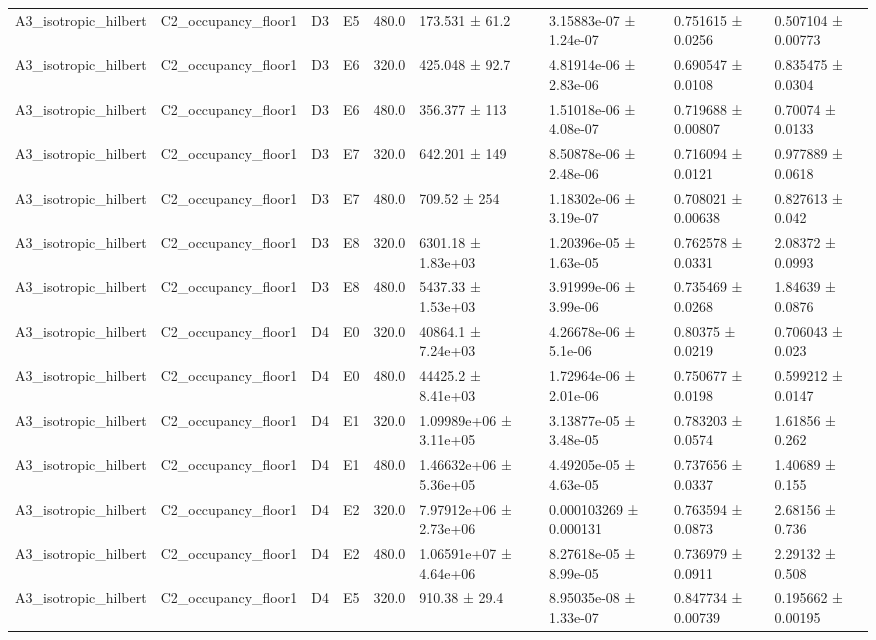 \begin{table}
\begin{tabular}{lllllllll}
A3\_isotropic\_hilbert & C2\_occupancy\_floor1 & D3 & E5 & 480.0 & 173.531 ± 61.2 & 3.15883e-07 ± 1.24e-07 & 0.751615 ± 0.0256 & 0.507104 ± 0.00773 \\
A3\_isotropic\_hilbert & C2\_occupancy\_floor1 & D3 & E6 & 320.0 & 425.048 ± 92.7 & 4.81914e-06 ± 2.83e-06 & 0.690547 ± 0.0108 & 0.835475 ± 0.0304 \\
A3\_isotropic\_hilbert & C2\_occupancy\_floor1 & D3 & E6 & 480.0 & 356.377 ± 113 & 1.51018e-06 ± 4.08e-07 & 0.719688 ± 0.00807 & 0.70074 ± 0.0133 \\
A3\_isotropic\_hilbert & C2\_occupancy\_floor1 & D3 & E7 & 320.0 & 642.201 ± 149 & 8.50878e-06 ± 2.48e-06 & 0.716094 ± 0.0121 & 0.977889 ± 0.0618 \\
A3\_isotropic\_hilbert & C2\_occupancy\_floor1 & D3 & E7 & 480.0 & 709.52 ± 254 & 1.18302e-06 ± 3.19e-07 & 0.708021 ± 0.00638 & 0.827613 ± 0.042 \\
A3\_isotropic\_hilbert & C2\_occupancy\_floor1 & D3 & E8 & 320.0 & 6301.18 ± 1.83e+03 & 1.20396e-05 ± 1.63e-05 & 0.762578 ± 0.0331 & 2.08372 ± 0.0993 \\
A3\_isotropic\_hilbert & C2\_occupancy\_floor1 & D3 & E8 & 480.0 & 5437.33 ± 1.53e+03 & 3.91999e-06 ± 3.99e-06 & 0.735469 ± 0.0268 & 1.84639 ± 0.0876 \\
A3\_isotropic\_hilbert & C2\_occupancy\_floor1 & D4 & E0 & 320.0 & 40864.1 ± 7.24e+03 & 4.26678e-06 ± 5.1e-06 & 0.80375 ± 0.0219 & 0.706043 ± 0.023 \\
A3\_isotropic\_hilbert & C2\_occupancy\_floor1 & D4 & E0 & 480.0 & 44425.2 ± 8.41e+03 & 1.72964e-06 ± 2.01e-06 & 0.750677 ± 0.0198 & 0.599212 ± 0.0147 \\
A3\_isotropic\_hilbert & C2\_occupancy\_floor1 & D4 & E1 & 320.0 & 1.09989e+06 ± 3.11e+05 & 3.13877e-05 ± 3.48e-05 & 0.783203 ± 0.0574 & 1.61856 ± 0.262 \\
A3\_isotropic\_hilbert & C2\_occupancy\_floor1 & D4 & E1 & 480.0 & 1.46632e+06 ± 5.36e+05 & 4.49205e-05 ± 4.63e-05 & 0.737656 ± 0.0337 & 1.40689 ± 0.155 \\
A3\_isotropic\_hilbert & C2\_occupancy\_floor1 & D4 & E2 & 320.0 & 7.97912e+06 ± 2.73e+06 & 0.000103269 ± 0.000131 & 0.763594 ± 0.0873 & 2.68156 ± 0.736 \\
A3\_isotropic\_hilbert & C2\_occupancy\_floor1 & D4 & E2 & 480.0 & 1.06591e+07 ± 4.64e+06 & 8.27618e-05 ± 8.99e-05 & 0.736979 ± 0.0911 & 2.29132 ± 0.508 \\
A3\_isotropic\_hilbert & C2\_occupancy\_floor1 & D4 & E5 & 320.0 & 910.38 ± 29.4 & 8.95035e-08 ± 1.33e-07 & 0.847734 ± 0.00739 & 0.195662 ± 0.00195 \\

\end{tabular}
\end{table}
